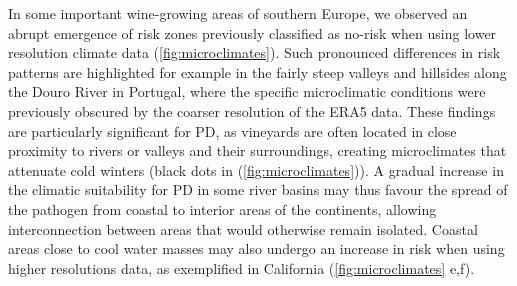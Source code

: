 In some important wine-growing areas of
southern Europe, we observed an abrupt emergence of risk zones previously
classified as no-risk when using lower resolution climate data
(\cref{fig:microclimates}). Such pronounced differences in risk patterns are
highlighted for example in the fairly steep valleys and hillsides along the
Douro River in Portugal, where the specific microclimatic conditions were
previously obscured by the coarser resolution of the ERA5 data. These findings
are particularly significant for PD,  as vineyards are often located in close
proximity to rivers or valleys and their surroundings, creating microclimates
that attenuate cold winters (black dots in (\cref{fig:microclimates})). A
gradual increase in the climatic suitability for PD in some river basins may
thus favour the spread of the pathogen from coastal  to interior areas of the
continents, allowing interconnection between areas that would otherwise remain
isolated. Coastal areas close to cool water masses may also undergo an increase
in risk  when using higher resolutions data, as exemplified in California
(\cref{fig:microclimates} e,f).


